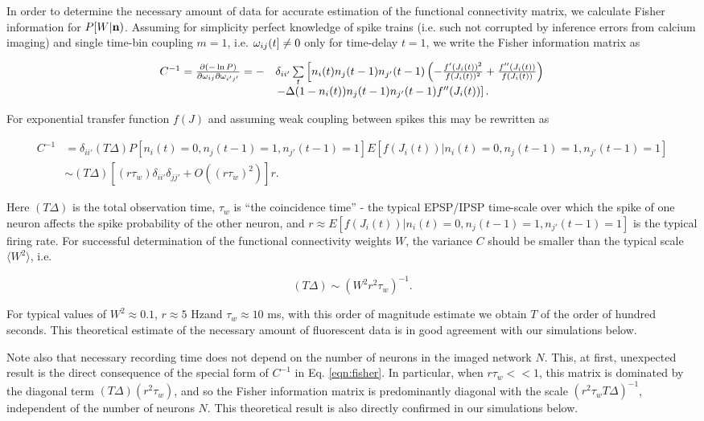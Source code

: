 In order to determine the necessary amount of data for accurate estimation of the functional connectivity matrix, we calculate Fisher information for $P[W|{\bf n})$. Assuming for simplicity perfect knowledge of spike trains (i.e. such not corrupted by inference errors from calcium imaging) and single time-bin coupling $m=1$, i.e. $\omega_{ij}(t]\neq 0$ only for time-delay $t=1$, we write the Fisher information matrix as

\begin{equation}
\begin{array}{rl}
C^{-1}=\frac{\partial (-\ln P)}{\partial \omega_{ij}\partial \omega_{i'j'}}
=-&\delta_{ii'}\sum\limits_t\left[
n_i(t)n_{j}(t-1)n_{j'}(t-1)\left(-\frac{f'(J_i(t))^2}{f(J_i(t))^2} +
\frac{f''(J_i(t))}{f(J_i(t))}\right) \right. \\
&\left.-\Delta (1-n_i(t))n_{j}(t-1)n_{j'}(t-1)f''(J_i(t))\right].
\end{array}
\end{equation}

For exponential transfer function $f(J)$ and assuming weak coupling between spikes this may be rewritten as

\begin{equation}\label{eqn:fisher}
\begin{array}{rl}
C^{-1}
&=\delta_{ii'} (T\Delta) P[n_i(t)=0, n_j(t-1)=1, n_{j'}(t-1)=1]E[f(J_i(t))|n_i(t)=0, n_j(t-1)=1, n_{j'}(t-1)=1] \\
&\sim (T\Delta)\left[(r \tau_w)\delta_{ii'}\delta_{jj'}+O((r \tau_w)^2)\right]r.
\end{array}
\end{equation}

Here $(T\Delta)$ is the total observation time, $ \tau_w$ is ``the coincidence time'' - the typical EPSP/IPSP time-scale over which the spike of one neuron affects the spike probability of the other neuron, and $r \approx E[f(J_i(t))|n_i(t)=0, n_j(t-1)=1, n_{j'}(t-1)=1]$ is the typical firing rate.  For successful determination of the functional connectivity weights $W$, the variance $C$ should be smaller than the typical scale $\langle W^2\rangle$, i.e.

\begin{equation}
(T\Delta) \sim (W^2 r^2  \tau_w)^{-1}.
\end{equation}

For typical values of $W^2\approx 0.1$, $r\approx 5$  Hzand $ \tau_w \approx 10$ ms, 
with this order of magnitude estimate we obtain $T$ of the order of hundred seconds.
This theoretical estimate of the necessary amount of fluorescent data is in good agreement with our simulations below.

Note also that necessary recording time does not depend on the number of neurons in the imaged network $N$. This, at first, unexpected result is the direct consequence of the special form of $C^{-1}$ in Eq. \eqref{eqn:fisher}. In particular, when $r \tau_w <<1$, this matrix is dominated by the diagonal term $(T\Delta)(r^2  \tau_w)$, and so the Fisher information matrix is predominantly diagonal with the scale $(r^2 \tau_w T\Delta)^{-1}$, independent of the number of neurons $N$. This theoretical result is also directly confirmed in our simulations below.
